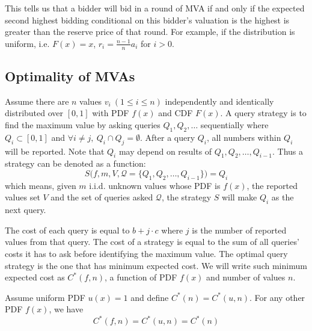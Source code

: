 This tells us that a bidder will bid in a round of MVA if and only if the
expected second highest bidding conditional on this bidder's valuation is the
highest is greater than the reserve price of that round. For example, if the
distribution is uniform, i.e. $F(x) = x$, $r_i = \frac{n-1}{n} a_i$ for
$i > 0$.

\subsection{Optimality of MVAs}

\begin{definition}

Assume there are $n$ values $v_i ~(1 \leq i \leq n)$ independently and
identically distributed over $[0, 1]$ with PDF $f(x)$ and CDF $F(x)$.  A query
strategy is to find the maximum value by asking queries $Q_1, Q_2, \ldots$
sequentially where $Q_i \subset [0, 1]$ and $\forall i \neq j, ~Q_i \cap Q_j =
\emptyset$.  After a query $Q_i$, all numbers within $Q_i$ will be reported.
Note that $Q_i$ may depend on results of $Q_1, Q_2, \ldots, Q_{i-1}$. Thus a
strategy can be denoted as a function:
\begin{displaymath}
	S\big(f, m, V, \mathcal Q = \{Q_1, Q_2, \ldots, Q_{i-1} \}\big) = Q_i
\end{displaymath}
which means, given $m$ i.i.d. unknown values whose PDF is $f(x)$, the reported
values set $V$ and the set of queries asked $\mathcal Q$, the strategy $S$ will
make $Q_i$ as the next query.

The cost of each query is equal to $b+j \cdot c$ where $j$ is the number of
reported values from that query. The cost of a strategy is equal to the sum of
all queries' costs it has to ask before identifying the maximum value. The
optimal query strategy is the one that has minimum expected cost.
We will write such minimum expected cost as $C^*(f, n)$, a function
of PDF $f(x)$ and number of values $n$.

\end{definition}

\begin{lemma}\label{lemma:uniform}

Assume uniform PDF $u(x) = 1$ and define $C^*(n) = C^*(u, n)$.
For any other PDF $f(x)$, we have 
\[C^*(f, n) = C^*(u, n) = C^*(n)\]

\end{lemma}

